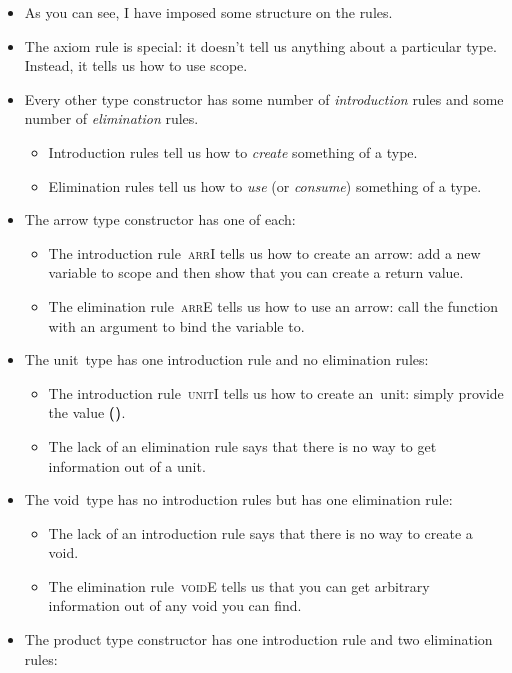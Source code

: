 \documentclass{lecturenotes}
\newcommand{\utype}{\textsf{unit}\xspace}
\newcommand{\unit}{\ensuremath{\textsf{(}\mkern0.5mu\textsf{)}}}
\newcommand{\vtype}{\textsf{void}\xspace}
\begin{document}
\vspace{2em}
\begin{itemize}
\item As you can see, I have imposed some structure on the rules.
\item The axiom rule is special: it doesn't tell us anything about a particular type.
  Instead, it tells us how to use scope.
\item Every other type constructor has some number of \emph{introduction} rules and some number of \emph{elimination} rules.
  \begin{itemize}
  \item Introduction rules tell us how to \emph{create} something of a type.
  \item Elimination rules tell us how to \emph{use} (or \emph{consume}) something of a type.
  \end{itemize}
\item The arrow type constructor has one of each:
  \begin{itemize}
  \item The introduction rule~\textsc{arrI} tells us how to create an arrow: add a new variable to scope and then show that you can create a return value.
  \item The elimination rule~\textsc{arrE} tells us how to use an arrow: call the function with an argument to bind the variable to.
  \end{itemize}
\item The \utype~type has one introduction rule and no elimination rules:
  \begin{itemize}
  \item The introduction rule~\textsc{unitI} tells us how to create an~\utype: simply provide the value $\unit$.
  \item The lack of an elimination rule says that there is no way to get information out of a \utype.
  \end{itemize}
\item The \vtype~type has no introduction rules but has one elimination rule:
  \begin{itemize}
  \item The lack of an introduction rule says that there is no way to create a \vtype.
  \item The elimination rule~\textsc{voidE} tells us that you can get arbitrary information out of any \vtype you can find.
  \end{itemize}
\item The product type constructor has one introduction rule and two elimination rules:

\end{itemize}
\end{document}
